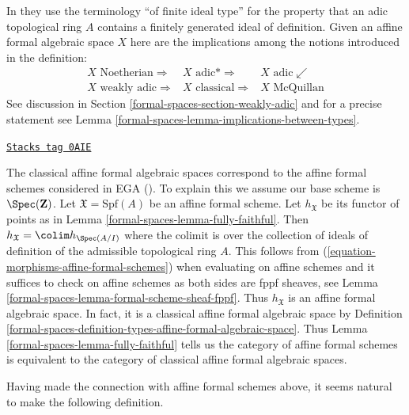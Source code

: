 In \cite{Fujiwara-Kato} they use the terminology ``of finite ideal type''
for the property that an adic topological ring $A$ contains a finitely
generated ideal of definition. Given an affine formal algebraic space $X$
here are the implications among the notions introduced in the definition:
$$
\begin{array}{ccc}X\text{ Noetherian} \Longrightarrow & X\text{ adic*} \Longrightarrow & X\text{ adic} \swarrow \\ X\text{ weakly adic} \Longrightarrow & X\text{ classical} \Longrightarrow & X\text{ McQuillan}\end{array}
$$
See discussion in Section \ref{formal-spaces-section-weakly-adic} and for a precise statement
see Lemma \ref{formal-spaces-lemma-implications-between-types}.

\begin{remark}
\label{formal-spaces-remark-compare-with-affine-formal-schemes}
\href{https://stacks.math.columbia.edu/tag/0AIE}{\texttt{Stacks tag 0AIE}}

The classical affine formal algebraic spaces correspond to the
affine formal schemes considered in EGA (\cite{EGA}). To explain this
we assume our base scheme is $\Spec(\mathbf{Z})$. Let
$\mathfrak X = \text{Spf}(A)$ be an affine formal scheme.
Let $h_\mathfrak X$ be its functor of points as in
Lemma \ref{formal-spaces-lemma-fully-faithful}.
Then $h_\mathfrak X = \colim h_{\Spec(A/I)}$ where the colimit
is over the collection of ideals of definition of the admissible
topological ring $A$. This follows from
(\ref{equation-morphisms-affine-formal-schemes})
when evaluating on affine schemes and it suffices to check
on affine schemes as both sides are fppf sheaves, see
Lemma \ref{formal-spaces-lemma-formal-scheme-sheaf-fppf}.
Thus $h_\mathfrak X$ is an affine formal algebraic space.
In fact, it is a classical affine formal algebraic space
by Definition \ref{formal-spaces-definition-types-affine-formal-algebraic-space}.
Thus Lemma \ref{formal-spaces-lemma-fully-faithful} tells us
the category of affine formal schemes is equivalent to the category
of classical affine formal algebraic spaces.
\end{remark}

Having made the connection with affine formal schemes above,
it seems natural to make the following definition.

